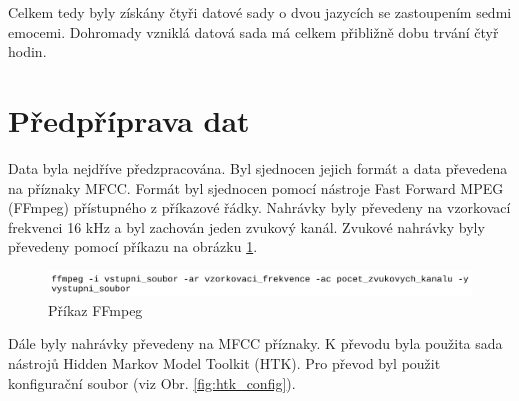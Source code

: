 \documentclass[FM,BP]{tulthesis}
\begin{document}
\begin{table}[ht]
\centering
{}
\caption{Přehled vybraných datových sad}
\label{tab:overview}
\end{table}
\FloatBarrier

Celkem tedy byly získány čtyři datové sady o dvou jazycích se zastoupením sedmi emocemi. Dohromady vzniklá datová sada má celkem přibližně dobu trvání čtyř hodin.

\section{Předpříprava dat} %
Data byla nejdříve předzpracována. Byl sjednocen jejich formát a data převedena na příznaky MFCC. Formát byl sjednocen pomocí nástroje Fast Forward MPEG (FFmpeg) přístupného z příkazové řádky. Nahrávky byly převedeny na vzorkovací frekvenci 16 kHz a byl zachován jeden zvukový kanál. Zvukové nahrávky byly převedeny pomocí příkazu na obrázku \ref{fig:ffmpeg}.

\begin{figure}[htbp]
\centerline{\includegraphics[width=\textwidth,height=\textheight,keepaspectratio]{ffmpeg_command.png}}
\caption{Příkaz FFmpeg}
\label{fig:ffmpeg}
\end{figure}
\FloatBarrier

Dále byly nahrávky převedeny na MFCC příznaky. K převodu byla použita sada nástrojů Hidden Markov Model Toolkit (HTK). Pro převod byl použit konfigurační soubor (viz Obr. \ref{fig:htk_config}).
\end{document}
